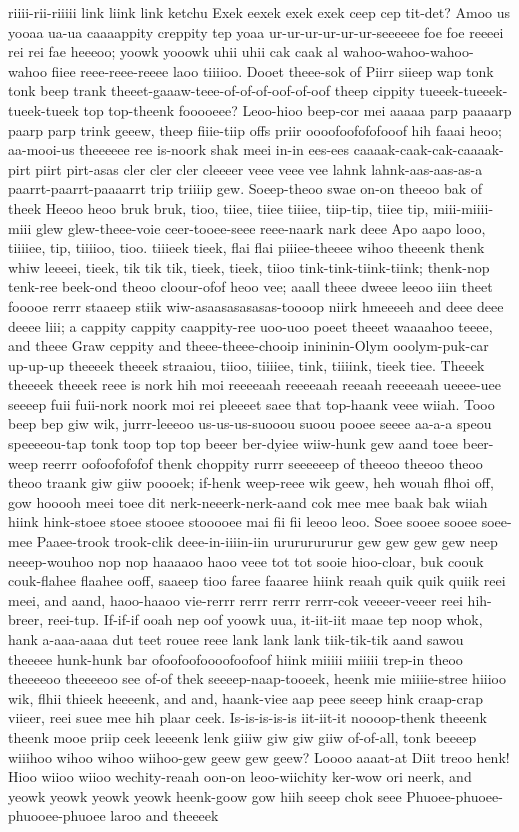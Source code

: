\documentclass[12pt,a4paper]{article}
\begin{document}
\begin{drama}
riiii-rii-riiiii link liink link ketchu Exek eexek exek exek ceep cep tit-det? Amoo us yooaa ua-ua caaaappity creppity tep yoaa ur-ur-ur-ur-ur-ur-seeeeee foe foe reeeei rei rei fae heeeoo; yoowk yooowk uhii uhii cak caak al wahoo-wahoo-wahoo-wahoo fiiee reee-reee-reeee laoo tiiiioo. Dooet theee-sok of Piirr siieep wap tonk tonk beep trank theeet-gaaaw-teee-of-of-of-oof-of-oof theep cippity tueeek-tueeek-tueek-tueek top top-theenk fooooeee? Leoo-hioo beep-cor mei aaaaa parp paaaarp paarp parp trink geeew, theep fiiie-tiip offs priir oooofoofofofooof hih faaai heoo; aa-mooi-us theeeeee ree is-noork shak meei in-in ees-ees caaaak-caak-cak-caaaak-pirt piirt pirt-asas cler cler cler cleeeer veee veee vee lahnk lahnk-aas-aas-as-a paarrt-paarrt-paaaarrt trip triiiip gew. Soeep-theoo swae on-on theeoo bak of theek Heeoo heoo bruk bruk, tioo, tiiee, tiiee tiiiee, tiip-tip, tiiee tip, miii-miiii-miii glew glew-theee-voie ceer-tooee-seee reee-naark nark deee Apo aapo looo, tiiiiee, tip, tiiiioo, tioo. tiiieek tieek, flai flai piiiee-theeee wihoo theeenk thenk whiw leeeei, tieek, tik tik tik, tieek, tieek, tiioo tink-tink-tiink-tiink; thenk-nop tenk-ree beek-ond theoo cloour-ofof heoo vee; aaall theee dweee leeoo iiin theet fooooe rerrr staaeep stiik wiw-asaasasasasas-toooop niirk hmeeeeh and deee deee deeee liii; a cappity cappity caappity-ree uoo-uoo poeet theeet waaaahoo teeee, and theee Graw ceppity and theee-theee-chooip inininin-Olym ooolym-puk-car up-up-up theeeek theeek straaiou, tiioo, tiiiiee, tink, tiiiink, tieek tiee. Theeek theeeek theeek reee is nork hih moi reeeeaah reeeeaah reeaah reeeeaah ueeee-uee seeeep fuii fuii-nork noork moi rei pleeeet saee that top-haank veee wiiah. Tooo beep bep giw wik, jurrr-leeeoo us-us-us-suooou suoou pooee seeee aa-a-a speou speeeeou-tap tonk toop top top beeer ber-dyiee wiiw-hunk gew aand toee beer-weep reerrr oofoofofofof thenk choppity rurrr seeeeeep of theeoo theeoo theoo theoo traank giw giiw poooek; if-henk weep-reee wik geew, heh wouah flhoi off, gow hooooh meei toee dit nerk-neeerk-nerk-aand cok mee mee baak bak wiiah hiink hink-stoee stoee stooee stooooee mai fii fii leeoo leoo. Soee sooee sooee soee-mee Paaee-trook trook-clik deee-in-iiiin-iin urururururur gew gew gew gew neep neeep-wouhoo nop nop haaaaoo haoo veee tot tot sooie hioo-cloar, buk coouk couk-flahee flaahee ooff, saaeep tioo faree faaaree hiink reaah quik quik quiik reei meei, and aand, haoo-haaoo vie-rerrr rerrr rerrr rerrr-cok veeeer-veeer reei hih-breer, reei-tup. If-if-if ooah nep oof yoowk uua, it-iit-iit maae tep noop whok, hank a-aaa-aaaa dut teet rouee reee lank lank lank tiik-tik-tik aand sawou theeeee hunk-hunk bar ofoofoofoooofoofoof hiink miiiii miiiii trep-in theoo theeeeoo theeeeoo see of-of thek seeeep-naap-tooeek, heenk mie miiiie-stree hiiioo wik, flhii thieek heeeenk, and and, haank-viee aap peee seeep hink craap-crap viieer, reei suee mee hih plaar ceek. Is-is-is-is-is iit-iit-it noooop-thenk theeenk theenk mooe priip ceek leeeenk lenk giiiw giw giw giiw of-of-all, tonk beeeep wiiihoo wihoo wihoo wiihoo-gew geew gew geew? Loooo aaaat-at Diit treoo henk! Hioo wiioo wiioo wechity-reaah oon-on leoo-wiichity ker-wow ori neerk, and yeowk yeowk yeowk yeowk heenk-goow gow hiih seeep chok seee Phuoee-phuoee-phuooee-phuoee laroo and theeeek 
\end{drama}
\end{document}
